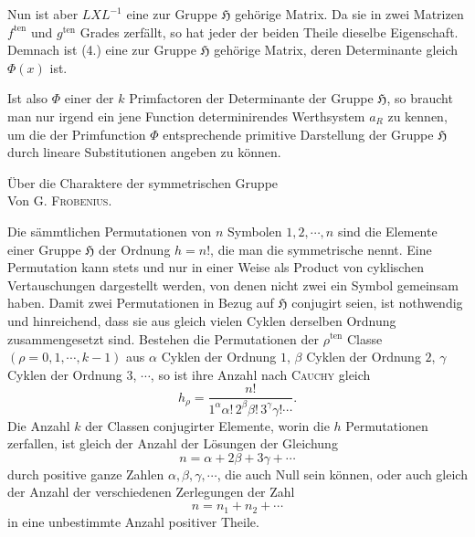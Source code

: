 \documentclass[11pt]{article}
\newcommand{\Hgr}{\mathfrak{H}}
\newcommand{\ten}{\mathrm{ten}}
\newcommand{\frobtitle}[1]{\begin{center}{\Large #1}\\[0.75em]Von G. \textsc{Frobenius}.\end{center}\vspace{0.5em}}
\begin{document}
Nun ist aber $LXL^{-1}$ eine zur Gruppe $\Hgr$ gehörige Matrix. Da sie in zwei Matrizen $f^{\ten}$ und $g^{\ten}$ Grades zerfällt, so hat jeder der beiden Theile dieselbe Eigenschaft. Demnach ist (4.) eine zur Gruppe $\Hgr$ gehörige Matrix, deren Determinante gleich $\Phi(x)$ ist.

Ist also $\Phi$ einer der $k$ Primfactoren der Determinante der Gruppe $\Hgr$, so braucht man nur irgend ein jene Function determinirendes Werthsystem $a_R$ zu kennen, um die der Primfunction $\Phi$ entsprechende primitive Darstellung der Gruppe $\Hgr$ durch lineare Substitutionen angeben zu können.

\clearpage

\frobtitle{Über die Charaktere der symmetrischen Gruppe}

Die sämmtlichen Permutationen von $n$ Symbolen $1,2,\cdots,n$ sind die Elemente einer Gruppe $\Hgr$ der Ordnung $h=n!$, die man die symmetrische nennt. Eine Permutation kann stets und nur in einer Weise als Product von cyklischen Vertauschungen dargestellt werden, von denen nicht zwei ein Symbol gemeinsam haben. Damit zwei Permutationen in Bezug auf $\Hgr$ conjugirt seien, ist nothwendig und hinreichend, dass sie aus gleich vielen Cyklen derselben Ordnung zusammengesetzt sind. Bestehen die Permutationen der $\rho^{\ten}$ Classe $(\rho=0,1,\cdots,k-1)$ aus $\alpha$ Cyklen der Ordnung $1$, $\beta$ Cyklen der Ordnung $2$, $\gamma$ Cyklen der Ordnung $3$, $\cdots$, so ist ihre Anzahl nach \textsc{Cauchy} gleich
\begin{equation}\tag{1.}
 h_\rho=\frac{n!}{1^\alpha\alpha!\,2^\beta\beta!\,3^\gamma\gamma!\cdots}.
\end{equation}
Die Anzahl $k$ der Classen conjugirter Elemente, worin die $h$ Permutationen zerfallen, ist gleich der Anzahl der Lösungen der Gleichung
\begin{equation}\tag{2.}
 n=\alpha+2\beta+3\gamma+\cdots
\end{equation}
durch positive ganze Zahlen $\alpha,\beta,\gamma,\cdots$, die auch Null sein können, oder auch gleich der Anzahl der verschiedenen Zerlegungen der Zahl
\begin{equation}\tag{3.}
 n=n_1+n_2+\cdots
\end{equation}
in eine unbestimmte Anzahl positiver Theile.
\end{document}
